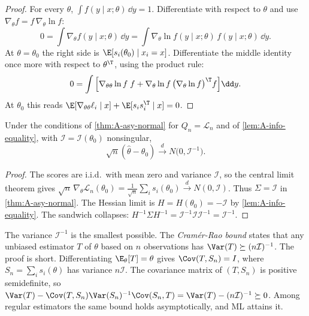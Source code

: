 \begin{proof}
For every $\theta$, $\int f(y \mid x;\theta)\,\dd y = 1$. Differentiate with respect to $\theta$ and use
$\nabla_\theta f = f\,\nabla_\theta\ln f$:
\begin{equation*}
  0 = \int\nabla_\theta f(y \mid x;\theta)\,\dd y = \int\nabla_\theta\ln f(y \mid x;\theta)\,f(y \mid x;\theta)\,\dd y.
\end{equation*}
At $\theta = \theta_0$ the right side is $\E[s_i(\theta_0) \mid x_i = x]$. Differentiate the middle identity once more with
respect to $\theta^\T$, using the product rule:
\begin{equation*}
  0 = \int\Big[\nabla_{\theta\theta}\ln f\;f + \nabla_\theta\ln f\,\big(\nabla_\theta\ln f\big)^\T f\Big]\dd y.
\end{equation*}
At $\theta_0$ this reads $\E[\nabla_{\theta\theta}\ell_i \mid x] + \E[s_is_i^\T \mid x] = 0$.
\end{proof}

\begin{theorem}\label{thm:A-mle-normal}
Under the conditions of \cref{thm:A-asy-normal} for $Q_n = \mathcal{L}_n$ and of \cref{lem:A-info-equality}, with
$\mathcal{I} = \mathcal{I}(\theta_0)$ nonsingular,
\begin{equation*}
  \sqrt{n}(\hat\theta - \theta_0) \xrightarrow{d} N\big(0, \mathcal{I}^{-1}\big).
\end{equation*}
\end{theorem}

\begin{proof}
The scores are i.i.d.\ with mean zero and variance $\mathcal{I}$, so the central limit theorem gives
$\sqrt{n}\,\nabla_\theta\mathcal{L}_n(\theta_0) = \frac{1}{\sqrt{n}}\sum_is_i(\theta_0) \xrightarrow{d} N(0, \mathcal{I})$. Thus
$\Sigma = \mathcal{I}$ in \cref{thm:A-asy-normal}. The Hessian limit is $H = H(\theta_0) = -\mathcal{I}$ by
\cref{lem:A-info-equality}. The sandwich collapses: $H^{-1}\Sigma H^{-1} = \mathcal{I}^{-1}\mathcal{I}\mathcal{I}^{-1} =
\mathcal{I}^{-1}$.
\end{proof}

The variance $\mathcal{I}^{-1}$ is the smallest possible. The \emph{Cram\'er-Rao bound} states that any unbiased estimator
$T$ of $\theta$ based on $n$ observations has $\Var(T) \succeq (n\mathcal{I})^{-1}$. The proof is short. Differentiating
$\E_\theta[T] = \theta$ gives $\Cov(T, S_n) = I$, where $S_n = \sum_is_i(\theta)$ has variance $n\mathcal{I}$. The covariance
matrix of $(T, S_n)$ is positive semidefinite, so $\Var(T) - \Cov(T, S_n)\Var(S_n)^{-1}\Cov(S_n, T) = \Var(T) -
(n\mathcal{I})^{-1} \succeq 0$. Among regular estimators the same bound holds asymptotically, and ML attains it.

